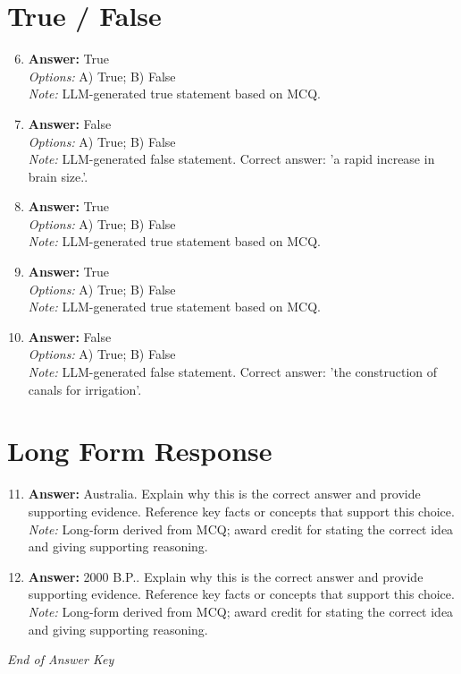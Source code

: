\documentclass[12pt]{article}
\begin{document}
\section*{True / False}
\begin{enumerate}[label=\arabic*.]
\setcounter{enumi}{5}
\item \textbf{Answer:} True
\\ \textit{Options:} A) True; B) False
\\ \textit{Note:} LLM-generated true statement based on MCQ.
\item \textbf{Answer:} False
\\ \textit{Options:} A) True; B) False
\\ \textit{Note:} LLM-generated false statement. Correct answer: 'a rapid increase in brain size.'.
\item \textbf{Answer:} True
\\ \textit{Options:} A) True; B) False
\\ \textit{Note:} LLM-generated true statement based on MCQ.
\item \textbf{Answer:} True
\\ \textit{Options:} A) True; B) False
\\ \textit{Note:} LLM-generated true statement based on MCQ.
\item \textbf{Answer:} False
\\ \textit{Options:} A) True; B) False
\\ \textit{Note:} LLM-generated false statement. Correct answer: 'the construction of canals for irrigation'.
\end{enumerate}

\section*{Long Form Response}
\begin{enumerate}[label=\arabic*.]
\setcounter{enumi}{10}
\item \textbf{Answer:} Australia. Explain why this is the correct answer and provide supporting evidence. Reference key facts or concepts that support this choice.
\\ \textit{Note:} Long-form derived from MCQ; award credit for stating the correct idea and giving supporting reasoning.
\item \textbf{Answer:} 2000 B.P.. Explain why this is the correct answer and provide supporting evidence. Reference key facts or concepts that support this choice.
\\ \textit{Note:} Long-form derived from MCQ; award credit for stating the correct idea and giving supporting reasoning.
\end{enumerate}

\vfill
\noindent\textit{End of Answer Key}
\end{document}
